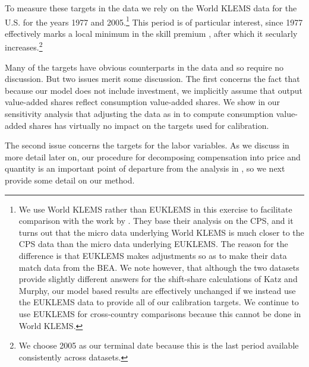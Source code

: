 \documentclass[12pt,english]{article}
\begin{document}
{\normalsize To measure these targets in the data we rely on the World KLEMS
data for the U.S. for the years 1977 and 2005.\footnote{%
We use World KLEMS rather than EUKLEMS in this exercise to facilitate
comparison with the work by \citet{KatMur92}. They base their analysis on
the CPS, and it turns out that the micro data underlying World KLEMS is much
closer to the CPS data than the micro data underlying EUKLEMS. The reason
for the difference is that EUKLEMS makes adjustments so as to make their
data match data from the BEA. We note however, that although the two
datasets provide slightly different answers for the shift-share calculations
of Katz and Murphy, our model based results are effectively unchanged if we
instead use the EUKLEMS data to provide all of our calibration targets. We
continue to use EUKLEMS for cross-country comparisons because this cannot be
done in World KLEMS.} This period is of particular interest, since 1977
effectively marks a local minimum in the skill premium 
\citep[see][for
earlier data]{AceAut11}, after which it secularly increases.\footnote{{We
choose 2005 as our terminal date because this is the last period available
consistently across datasets.}} }

{\normalsize Many of the targets have obvious counterparts in the data and
so require no discussion. But two issues merit some discussion. The first
concerns the fact that because our model does not include investment, we
implicitly assume that output value-added shares reflect consumption
value-added shares. We show in our sensitivity analysis that adjusting the
data as in \citet{HRV13} to compute consumption value-added shares has
virtually no impact on the targets used for calibration. }

{\normalsize The second issue concerns the targets for the labor variables.
As we discuss in more detail later on, our procedure for decomposing
compensation into price and quantity is an important point of departure from
the analysis in \citet{KatMur92}, so we next provide some detail on our
method. }
\end{document}

